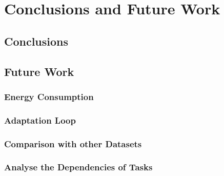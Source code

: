 

\chapter{Conclusions and Future Work}
\label{ch:conclusions-and-future-work}

    \section{Conclusions}
    \label{sec:conclusions}

    \section{Future Work}
    \label{sec:future-work}

        \subsection{Energy Consumption}
        \label{sec:energy-consumption-future-work}


        \subsection{Adaptation Loop}
        \label{sec:adaptation-loop-future-work}


        \subsection{Comparison with other Datasets}
        \label{sec:comparison-with-other-datasets-future-work}


        \subsection{Analyse the Dependencies of Tasks}
        \label{sec:analyse-the-dependencies-of-tasks-future-work}

